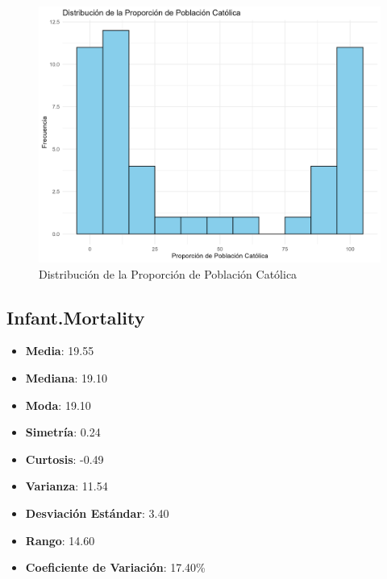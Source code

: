 \documentclass{article}
\begin{document}
\begin{figure}[h!]
\centering
\includegraphics[width=\textwidth]{Histogramas/histogram_catholic.png}
\caption{Distribución de la Proporción de Población Católica}
\end{figure}

\subsection{Infant.Mortality}
\begin{itemize}
    \item \textbf{Media}: 19.55
    \item \textbf{Mediana}: 19.10
    \item \textbf{Moda}: 19.10
    \item \textbf{Simetría}: 0.24
    \item \textbf{Curtosis}: -0.49
    \item \textbf{Varianza}: 11.54
    \item \textbf{Desviación Estándar}: 3.40
    \item \textbf{Rango}: 14.60
    \item \textbf{Coeficiente de Variación}: 17.40\%
\end{itemize}
\end{document}
